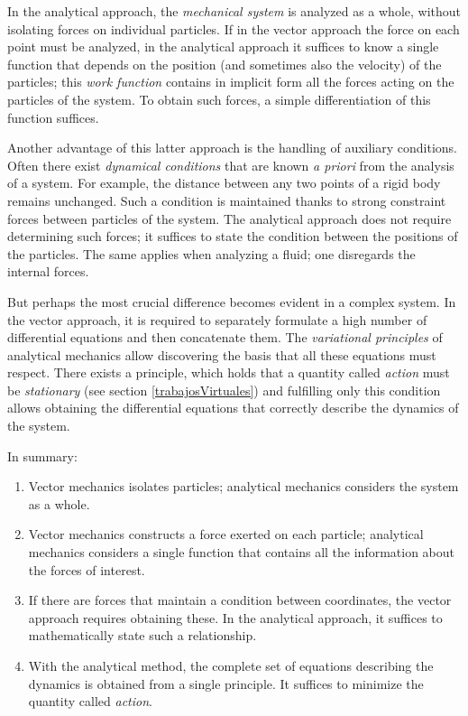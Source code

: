 \documentclass[12pt, english, a4paper]{article}
\begin{document}
In the analytical approach, the \emph{mechanical system} is analyzed as a whole, without isolating forces on individual particles.
If in the vector approach the force on each point must be analyzed, in the analytical approach it suffices to know a single function that depends on the position (and sometimes also the velocity) of the particles; this \emph{work function} contains in implicit form all the forces acting on the particles of the system.
To obtain such forces, a simple differentiation of this function suffices.

Another advantage of this latter approach is the handling of auxiliary conditions.
Often there exist \emph{dynamical conditions} that are known \emph{a priori} from the analysis of a system.
For example, the distance between any two points of a rigid body remains unchanged.
Such a condition is maintained thanks to strong constraint forces between particles of the system.
The analytical approach does not require determining such forces; it suffices to state the condition between the positions of the particles.
The same applies when analyzing a fluid; one disregards the internal forces.

But perhaps the most crucial difference becomes evident in a complex system.
In the vector approach, it is required to separately formulate a high number of differential equations and then concatenate them.
The \emph{variational principles} of analytical mechanics allow discovering the basis that all these equations must respect.
There exists a principle, which holds that a quantity called \emph{action} must be \emph{stationary} (see section \ref{trabajosVirtuales}) and fulfilling only this condition allows obtaining the differential equations that correctly describe the dynamics of the system.

In summary:
\begin{enumerate}
	\item Vector mechanics isolates particles; analytical mechanics considers the system as a whole.
	\item Vector mechanics constructs a force exerted on each particle; analytical mechanics considers a single function that contains all the information about the forces of interest.
	\item If there are forces that maintain a condition between coordinates, the vector approach requires obtaining these. In the analytical approach, it suffices to mathematically state such a relationship.
	\item With the analytical method, the complete set of equations describing the dynamics is obtained from a single principle. It suffices to minimize the quantity called \emph{action}.
\end{enumerate}
\end{document}
